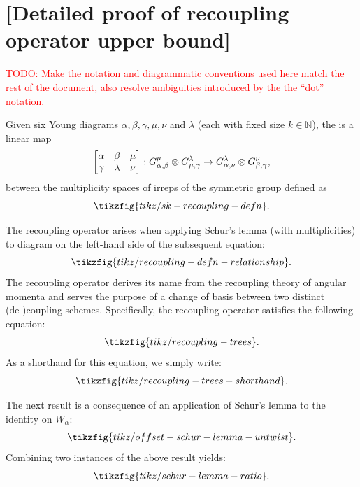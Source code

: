 \documentclass[notitlepage, 10pt]{article}
\begin{document}
\appendix

\clearpage
\section{[Detailed proof of recoupling operator upper bound]}
\label{sec:recouple_bound_proof}

\textcolor{red}{TODO: Make the notation and diagrammatic conventions used here match the rest of the document, also resolve ambiguities introduced by the the ``dot'' notation.}

\begin{defn}
    Given six Young diagrams $\alpha, \beta, \gamma, \mu, \nu$ and $\lambda$ (each with fixed size $k \in \mathbb N$), the  is a linear map 
    \begin{equation}
        \begin{bmatrix} \alpha & \beta & \mu \\ \gamma & \lambda & \nu \end{bmatrix}
        :
        G^{\mu}_{\alpha,\beta} \otimes G^{\lambda}_{\mu,\gamma} \to G^{\lambda}_{\alpha, \nu} \otimes G^{\nu}_{\beta,\gamma},
    \end{equation}
    between the multiplicity spaces of irreps of the symmetric group defined as
    \begin{equation}
        \tikzfig{tikz/sk-recoupling-defn}.
    \end{equation}
\end{defn}

The recoupling operator arises when applying Schur's lemma (with multiplicities) to diagram on the left-hand side of the subsequent equation:
\begin{equation}
    \tikzfig{tikz/recoupling-defn-relationship}.
\end{equation}
The recoupling operator derives its name from the recoupling theory of angular momenta and serves the purpose of a change of basis between two distinct (de-)coupling schemes.
Specifically, the recoupling operator satisfies the following equation:
\begin{equation}
    \label{eq:recoupling-trees}
    \tikzfig{tikz/recoupling-trees}.
\end{equation}
As a shorthand for this equation, we simply write:
\begin{equation}
    \tikzfig{tikz/recoupling-trees-shorthand}.
\end{equation}

The next result is a consequence of an application of Schur's lemma to the identity on $W_{\alpha}$:
\begin{equation}
    \tikzfig{tikz/offset-schur-lemma-untwist}.
\end{equation}
Combining two instances of the above result yields:
\begin{equation}
    \tikzfig{tikz/schur-lemma-ratio}.
\end{equation}
\end{document}
